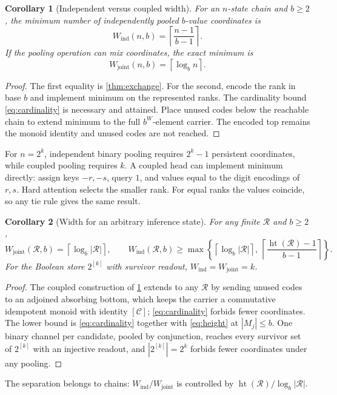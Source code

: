 \documentclass{article}
\newtheorem{corollary}[corollary]{Corollary}
\theoremstyle{definition}
\newcommand{\C}{\mathcal C}
\newcommand{\R}{\mathcal R}
\newcommand{\height}{\operatorname{ht}}
\newcommand{\ceil}[1]{\left\lceil #1\right\rceil}
\begin{document}
\begin{corollary}[Independent versus coupled width]\label{cor:width}
For an $n$-state chain and $b\ge2$, the minimum number of independently pooled $b$-value coordinates is
\begin{equation}
 W_{\mathrm{ind}}(n,b)=\ceil{\frac{n-1}{b-1}}.
 \label{eq:widthind}
\end{equation}
If the pooling operation can mix coordinates, the exact minimum is
\begin{equation}
 W_{\mathrm{joint}}(n,b)=\ceil{\log_b n}.\label{eq:widthjoint}
\end{equation}
\end{corollary}
\begin{proof}
The first equality is \cref{thm:exchange}. For the second, encode the rank in base $b$ and implement minimum on the represented ranks. The cardinality bound \eqref{eq:cardinality} is necessary and attained. Place unused codes below the reachable chain to extend minimum to the full $b^W$-element carrier. The encoded top remains the monoid identity and unused codes are not reached.
\end{proof}

For $n=2^k$, independent binary pooling requires $2^k-1$ persistent coordinates, while coupled pooling requires $k$. A coupled head can implement minimum directly: assign keys $-r,-s$, query $1$, and values equal to the digit encodings of $r,s$. Hard attention selects the smaller rank. For equal ranks the values coincide, so any tie rule gives the same result.

\begin{corollary}[Width for an arbitrary inference state]\label{cor:general}
For any finite $\R$ and $b\ge2$,
\begin{equation}
 W_{\mathrm{joint}}(\R,b)=\ceil{\log_b|\R|},\qquad
 W_{\mathrm{ind}}(\R,b)\ge\max\left\{\ceil{\log_b|\R|},\ \ceil{\frac{\height(\R)-1}{b-1}}\right\}.
 \label{eq:general}
\end{equation}
For the Boolean store $2^{[k]}$ with survivor readout, $W_{\mathrm{ind}}=W_{\mathrm{joint}}=k$.
\end{corollary}
\begin{proof}
The coupled construction of \cref{cor:width} extends to any $\R$ by sending unused codes to an adjoined absorbing bottom, which keeps the carrier a commutative idempotent monoid with identity $[\C]$; \eqref{eq:cardinality} forbids fewer coordinates. The lower bound is \eqref{eq:cardinality} together with \eqref{eq:height} at $|M_j|\le b$. One binary channel per candidate, pooled by conjunction, reaches every survivor set of $2^{[k]}$ with an injective readout, and $|2^{[k]}|=2^k$ forbids fewer coordinates under any pooling.
\end{proof}
The separation belongs to chains: $W_{\mathrm{ind}}/W_{\mathrm{joint}}$ is controlled by $\height(\R)/\log_b|\R|$.
\end{document}
